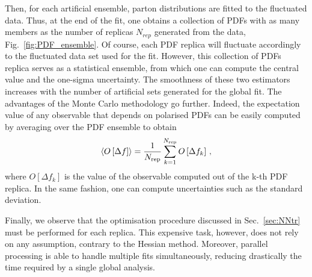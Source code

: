 Then, for each artificial ensemble, parton distributions are fitted to the fluctuated data. Thus, at the end of the fit, one obtains a collection of PDFs with as many members as the number of replicas $N_{rep}$ generated from the data, Fig.~\ref{fig:PDF_ensemble}. Of course, each PDF replica will fluctuate accordingly to the fluctuated data set used for the fit. However, this collection of PDFs replica serves as a statistical ensemble, from which one can compute the central value and the one-sigma uncertainty. The smoothness of these two estimators increases with the number of artificial sets generated for the global fit. The advantages of the Monte Carlo methodology go further. Indeed, the expectation value of any observable that depends on polarised PDFs can be easily computed by averaging over the PDF ensemble to obtain
\begin{equation}
  \left< O\left[ \Delta f \right] \right> = \frac{1}{N_{\textrm{rep}}} \sum_{k=1}^{N_{\textrm{rep}}} O\left[\Delta f_k\right] \,,
\end{equation}
where $O\left[\Delta f_k\right]$ is the value of the observable computed out of the k-th PDF replica. In the same fashion, one can compute uncertainties such as the standard deviation.\par
Finally, we observe that the optimisation procedure discussed in Sec.~\ref{sec:NNtr} must be performed for each replica. This expensive task, however, does not rely on any assumption, contrary to the Hessian method. Moreover, parallel processing is able to handle multiple fits simultaneously, reducing drastically the time required by a single global analysis.

